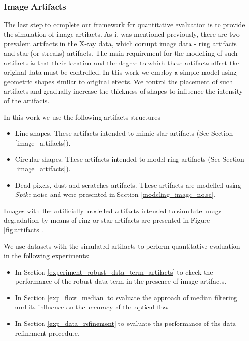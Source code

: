 \subsubsection{Image Artifacts}

The last step to complete our framework for quantitative evaluation is to provide the simulation of image artifacts. As it was mentioned previously, there are two prevalent artifacts in the X-ray data, which corrupt image data - ring artifacts and star (or streaks) artifacts. The main requirement for the modelling of such artifacts is that their location and the degree to which these artifacts affect the original data must be controlled.    
In this work we employ a simple model using geometric shapes similar to original effects. We control the placement of such artifacts and gradually increase the thickness of shapes to influence the intensity of the artifacts.

In this work we use the following artifacts structures:
\begin{itemize}
	\item Line shapes. These artifacts intended to mimic star artifacts (See Section \ref{image_artifacts}).  
	\item Circular shapes. These artifacts intended to model ring artifacts (See Section \ref{image_artifacts}).
	\item Dead pixels, dust and scratches artifacts. These artifacts are modelled using \textit{Spike} noise and were presented in Section \ref{modeling_image_noise}.
\end{itemize}

Images with the artificially modelled artifacts intended to simulate image degradation by means of ring or star artifacts are presented in Figure \ref{fig:artifacts}.

We use datasets with the simulated artifacts to perform quantitative evaluation in the following experiments:

\begin{itemize}
	
	\item In Section \ref{experiment_robust_data_term_artifacts}  to check the performance of the robust data term in the presence of image artifacts.
	
	\item In Section \ref{exp_flow_median} to evaluate the approach of median filtering and its influence on the accuracy of the optical flow.
	
	\item In Section \ref{exp_data_refinement} to evaluate the performance of the data refinement procedure.
	
\end{itemize}


